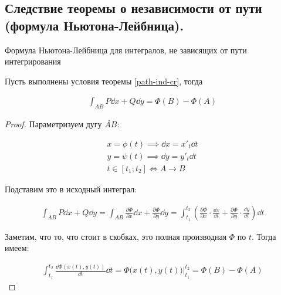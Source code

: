 \subsection{%
  Следствие теоремы о независимости от пути (формула Ньютона-Лейбница).%
}

\begin{theorem}
  Формула Ньютона-Лейбница для интегралов, не зависящих от пути интегрирования

  Пусть выполнены условия теоремы \ref{path-ind-cr}, тогда

  \begin{align*}
    \int_{AB} P \dd x + Q \dd y = \Phi(B) - \Phi(A)
  \end{align*}
\end{theorem}
\begin{proof}
  Параметризуем дугу \(\breve{AB}\):

  \begin{align*}
    x = \phi(t) \implies \dd x = x'_{t} \dd t \\
    y = \psi(t) \implies \dd y = y'_{t} \dd t \\
    t \in [t_{1}; t_{2}] \iff A \to B
  \end{align*}

  Подставим это в исходный интеграл:

  \begin{align*}
    \int_{AB} P \dd x + Q \dd y
    = \int_{AB} \frac{\partial \Phi}{\partial x} \dd x
      + \frac{\partial \Phi}{\partial y} \dd y
    = \int_{t_{1}}^{t_{2}} \left(
      \frac{\partial \Phi}{\partial x} \cdot \frac{\dd x}{\dd t} 
      + \frac{\partial \Phi}{\partial y} \cdot \frac{\dd y}{\dd t} 
    \right) \dd t  
  \end{align*}

  Заметим, что то, что стоит в скобках, это полная производная \(\Phi\) по
  \(t\). Тогда имеем:

  \begin{align*}
    \int_{t_{1}}^{t_{2}} \frac{\dd \Phi(x(t), y(t))}{\dd t} \dd t
    = \Phi \Big( x(t), y(t) \Big) \bigg\vert_{t_{1}}^{t_{2}}
    = \Phi(B) - \Phi(A)
  \end{align*}
\end{proof}

